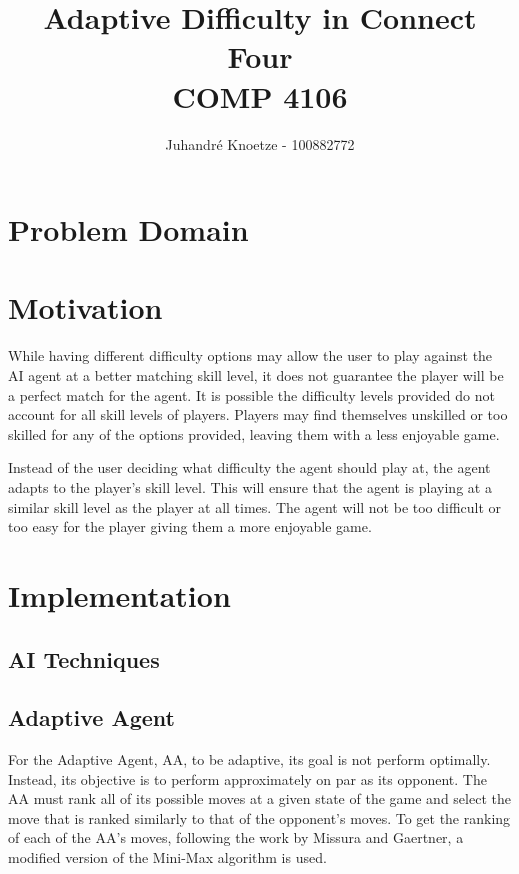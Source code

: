 \documentclass[12pt]{article}
\title{
    \vfill
    Adaptive Difficulty in Connect Four \\
    COMP 4106
}
\author{
    Juhandr\'{e} Knoetze - 100882772
}
\begin{document}
\begin{titlepage}
    \maketitle
    \vfill
    \thispagestyle{empty}
\end{titlepage}





\section*{Problem Domain}


\section*{Motivation}
While having different difficulty options may allow the user to play against the AI agent at a better matching skill level, it does not guarantee the player will be a perfect match for the agent. It is possible the difficulty levels provided do not account for all skill levels of players. Players may find themselves unskilled or too skilled for any of the options provided, leaving them with a less enjoyable game.

Instead of the user deciding what difficulty the agent should play at, the agent adapts to the player's skill level. This will ensure that the agent is playing at a similar skill level as the player at all times. The agent will not be too difficult or too easy for the player giving them a more enjoyable game.

\section*{Implementation}
\subsection*{AI Techniques}

\subsection*{Adaptive Agent}
For the Adaptive Agent, AA, to be adaptive, its goal is not perform optimally. Instead, its objective is to perform approximately on par as its opponent. The AA must rank all of its possible moves at a given state of the game and select the move that is ranked similarly to that of the opponent's moves. To get the ranking of each of the AA's moves, following the work by Missura and Gaertner, a modified version of the Mini-Max algorithm is used.
\end{document}
